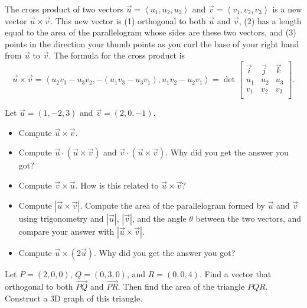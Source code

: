 \begin{definition}
The cross product of two vectors $\vec u = \left<u_1,u_2,u_3\right>$ and $\vec v = \left<v_1,v_2,v_3\right>$ is a new vector $\vec u\times \vec v$. This new vector is (1) orthogonal to both $\vec u$ and $\vec v$, (2) has a length equal to the area of the parallelogram whose sides are these two vectors, and (3) points in the direction your thumb points as you curl the base of your right hand from $\vec u$ to $\vec v$. The formula for the cross product is $$\vec u\times \vec v = \left<u_2v_3-u_3v_2,-(u_1v_3-u_3v_1),u_1v_2-u_2v_1\right> = \det\begin{bmatrix}\vec i & \vec j&\vec k\\ u_1&u_2&u_3\\ v_1&v_2&v_3\\\end{bmatrix}.$$
\end{definition}

\begin{problem}  
Let $\vec u=(1,-2,3)$ and $\vec v=(2,0,-1)$.  
\begin{itemize}
\item Compute $\vec u\times \vec v$.
\item Compute $\vec u \cdot (\vec u\times \vec v)$ and $\vec v \cdot (\vec u\times \vec v)$. Why did you get the answer you got?
\item Compute $\vec v\times \vec u$.  How is this related to $\vec u\times \vec v$?
\item Compute $|\vec u \times \vec v|$.  Compute the area of the parallelogram formed by $\vec u$ and $\vec v$ using trigonometry and $|\vec u|$, $|\vec v|$, and the angle $\theta$ between the two vectors, and compare your answer with $|\vec u \times \vec v|$.
\item Compute $\vec u \times (2\vec u)$.  Why did you get the answer you got?
\end{itemize}
\end{problem}

\begin{problem}  
Let $P=(2,0,0)$, $Q=(0,3,0)$, and $R=(0,0,4)$. Find a vector that orthogonal to both $\vec {PQ}$ and $\vec {PR}$. Then find the area of the triangle $PQR$. Construct a 3D graph of this triangle.
\end{problem}

